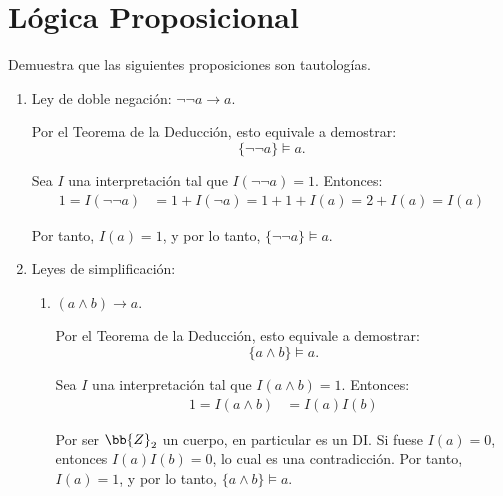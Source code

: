 \section{Lógica Proposicional}

\begin{comment}
\setcounter{ejercicio}{0}
\begin{ejercicio}\label{ej:1.1}
    Demuestra que el conjunto de proposiciones es numerable.
\end{ejercicio}
\end{comment}

\setcounter{ejercicio}{1}
\begin{ejercicio}\label{ej:1.2}
    Demuestra que las siguientes proposiciones son tautologías.
    \begin{enumerate}
        \item Ley de doble negación: $\neg\neg a \rightarrow a$.
        
        Por el Teorema de la Deducción, esto equivale a demostrar:
        \begin{equation*}
            \{\neg\neg a\} \models a.
        \end{equation*}

        Sea $I$ una interpretación tal que $I(\neg\neg a) = 1$. Entonces:
        \begin{align*}
            1=I(\neg\neg a) &= 1 + I(\neg a) = 1+1+I(a) = 2+I(a) = I(a)
        \end{align*}

        Por tanto, $I(a) = 1$, y por lo tanto, $\{\neg\neg a\} \models a$.
        \item Leyes de simplificación:
        \begin{enumerate}
            \item $(a\land b) \rightarrow a$.
            
            Por el Teorema de la Deducción, esto equivale a demostrar:
            \begin{equation*}
                \{a\land b\} \models a.
            \end{equation*}

            Sea $I$ una interpretación tal que $I(a\land b) = 1$. Entonces:
            \begin{align*}
                1=I(a\land b) &= I(a)I(b)
            \end{align*}
            
            Por ser $\bb{Z}_2$ un cuerpo, en particular es un DI. Si fuese $I(a) = 0$, entonces $I(a)I(b) = 0$, lo cual es una contradicción. Por tanto, $I(a) = 1$, y por lo tanto, $\{a\land b\} \models a$.



\end{enumerate}
\end{enumerate}
\end{ejercicio}
